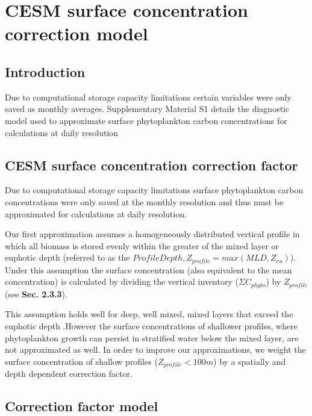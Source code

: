 \chapter{CESM surface concentration correction model}
\label{sec:appA}
\raggedbottom

\clearpage


\section{Introduction}

Due to computational storage capacity limitations certain variables were only saved as monthly averages. Supplementary Material S1 details the diagnostic model used to approximate surface phytoplankton carbon concentrations for calculations at daily
resolution

\section{CESM surface concentration correction factor}

Due to computational storage capacity limitations surface phytoplankton carbon
concentrations were only saved at the monthly resolution and thus must be approximated
for calculations at daily resolution.

Our first approximation assumes a homogeneously distributed vertical profile in
which all biomass is stored evenly within the greater of the mixed layer or euphotic depth (referred to as the $Profile Depth, Z_{profile} = max(MLD, Z_{eu})$). Under this assumption the surface concentration (also equivalent to the mean concentration) is calculated by dividing the vertical inventory ($\Sigma C_{phyto}$) by $Z_{profile}$ (see \textbf{Sec. 2.3.3}).

This assumption holds well for deep, well mixed, mixed layers that exceed the
euphotic depth \parencite{BossObservationspigmentparticle2008,Bosssituevaluationinitiation2010, BehrenfeldAnnualcyclesecological2013}.However the surface concentrations of shallower profiles, where phytoplankton growth can persist in stratified water below the mixed layer, are not approximated as well. In order to improve our approximations, we weight the surface concentration of shallow profiles ($Z_{profile} <100m$) by a spatially and depth dependent correction factor.

\section{Correction factor model}

